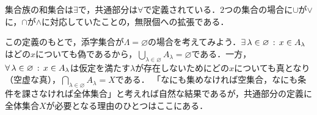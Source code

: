 \begin{remark}[添字集合が空の場合]
  集合族の和集合は$\exists$で，共通部分は$\forall$で定義されている．$2$つの集合の場合に$\cup$が$\lor$に，$\cap$が$\land$に対応していたことの，無限個への拡張である．

  この定義のもとで，添字集合が$\Lambda = \varnothing$の場合を考えてみよう．$\exists\, \lambda \in \varnothing \,:\, x \in A_\lambda$はどの$x$についても偽であるから，$\bigcup_{\lambda \in \varnothing} A_\lambda = \varnothing$である．一方，$\forall\, \lambda \in \varnothing \,:\, x \in A_\lambda$は仮定を満たす$\lambda$が存在しないためにどの$x$についても真となり（空虚な真），$\bigcap_{\lambda \in \varnothing} A_\lambda = X$である．
  「なにも集めなければ空集合，なにも条件を課さなければ全体集合」と考えれば自然な結果であるが，共通部分の定義に全体集合$X$が必要となる理由のひとつはここにある．
\end{remark}
